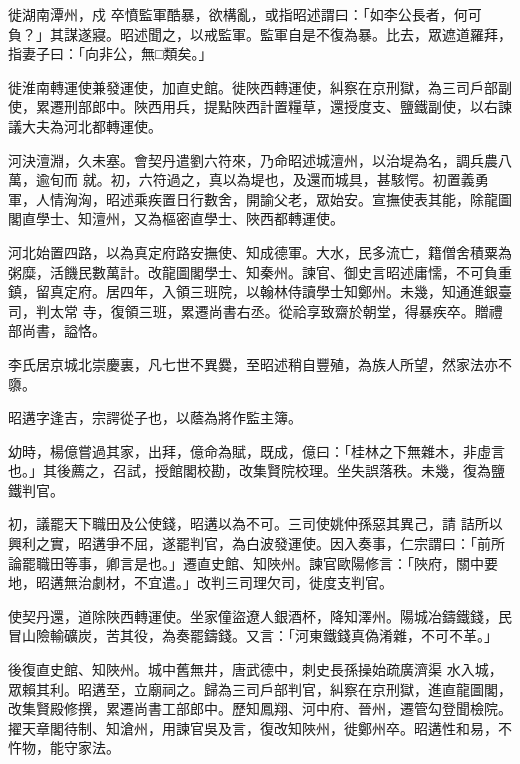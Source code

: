 \begin{pinyinscope}
 徙湖南潭州，戍
 卒憤監軍酷暴，欲構亂，或指昭述謂曰：「如李公長者，何可負？」其謀遂寢。昭述聞之，以戒監軍。監軍自是不復為暴。比去，眾遮道羅拜，指妻子曰：「向非公，無□類矣。」



 徙淮南轉運使兼發運使，加直史館。徙陜西轉運使，糾察在京刑獄，為三司戶部副使，累遷刑部郎中。陜西用兵，提點陜西計置糧草，還授度支、鹽鐵副使，以右諫議大夫為河北都轉運使。



 河決澶淵，久未塞。會契丹遣劉六符來，乃命昭述城澶州，以治堤為名，調兵農八萬，逾旬而
 就。初，六符過之，真以為堤也，及還而城具，甚駭愕。初置義勇軍，人情洶洶，昭述乘疾置日行數舍，開諭父老，眾始安。宣撫使表其能，除龍圖閣直學士、知澶州，又為樞密直學士、陜西都轉運使。



 河北始置四路，以為真定府路安撫使、知成德軍。大水，民多流亡，籍僧舍積粟為粥糜，活饑民數萬計。改龍圖閣學士、知秦州。諫官、御史言昭述庸懦，不可負重鎮，留真定府。居四年，入領三班院，以翰林侍讀學士知鄭州。未幾，知通進銀臺司，判太常
 寺，復領三班，累遷尚書右丞。從祫享致齋於朝堂，得暴疾卒。贈禮部尚書，謚恪。



 李氏居京城北崇慶裏，凡七世不異爨，至昭述稍自豐殖，為族人所望，然家法亦不隳。



 昭遘字逢吉，宗諤從子也，以蔭為將作監主簿。



 幼時，楊億嘗過其家，出拜，億命為賦，既成，億曰：「桂林之下無雜木，非虛言也。」其後薦之，召試，授館閣校勘，改集賢院校理。坐失誤落秩。未幾，復為鹽鐵判官。



 初，議罷天下職田及公使錢，昭遘以為不可。三司使姚仲孫惡其異己，請
 詰所以興利之實，昭遘爭不屈，遂罷判官，為白波發運使。因入奏事，仁宗謂曰：「前所論罷職田等事，卿言是也。」遷直史館、知陜州。諫官歐陽修言：「陜府，關中要地，昭遘無治劇材，不宜遣。」改判三司理欠司，徙度支判官。



 使契丹還，道除陜西轉運使。坐家僮盜遼人銀酒杯，降知澤州。陽城冶鑄鐵錢，民冒山險輸礦炭，苦其役，為奏罷鑄錢。又言：「河東鐵錢真偽淆雜，不可不革。」



 後復直史館、知陜州。城中舊無井，唐武德中，刺史長孫操始疏廣濟渠
 水入城，眾賴其利。昭遘至，立廟祠之。歸為三司戶部判官，糾察在京刑獄，進直龍圖閣，改集賢殿修撰，累遷尚書工部郎中。歷知鳳翔、河中府、晉州，遷管勾登聞檢院。擢天章閣待制、知滄州，用諫官吳及言，復改知陜州，徙鄭州卒。昭遘性和易，不忤物，能守家法。




\end{pinyinscope}
